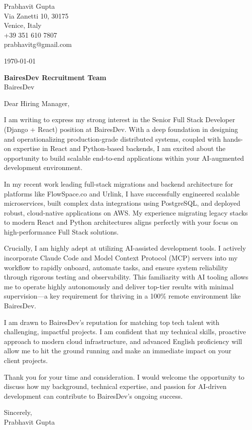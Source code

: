 \documentclass[11pt,a4paper]{article}
\begin{document}
\begin{flushright}
Prabhavit Gupta \\
Via Zanetti 10, 30175 \\
Venice, Italy \\
+39 351 610 7807 \\
prabhavitg@gmail.com \\
\end{flushright}

\vspace{2em}

\noindent
\today

\vspace{1em}

\noindent
\textbf{BairesDev Recruitment Team} \\
BairesDev

\vspace{2em}

\noindent
Dear Hiring Manager,

\vspace{1em}

I am writing to express my strong interest in the Senior Full Stack Developer (Django + React) position at BairesDev. With a deep foundation in designing and operationalizing production-grade distributed systems, coupled with hands-on expertise in React and Python-based backends, I am excited about the opportunity to build scalable end-to-end applications within your AI-augmented development environment.

In my recent work leading full-stack migrations and backend architecture for platforms like FlowSpace.co and Urlink, I have successfully engineered scalable microservices, built complex data integrations using PostgreSQL, and deployed robust, cloud-native applications on AWS. My experience migrating legacy stacks to modern React and Python architectures aligns perfectly with your focus on high-performance Full Stack solutions.

Crucially, I am highly adept at utilizing AI-assisted development tools. I actively incorporate Claude Code and Model Context Protocol (MCP) servers into my workflow to rapidly onboard, automate tasks, and ensure system reliability through rigorous testing and observability. This familiarity with AI tooling allows me to operate highly autonomously and deliver top-tier results with minimal supervision—a key requirement for thriving in a 100\% remote environment like BairesDev.

I am drawn to BairesDev's reputation for matching top tech talent with challenging, impactful projects. I am confident that my technical skills, proactive approach to modern cloud infrastructure, and advanced English proficiency will allow me to hit the ground running and make an immediate impact on your client projects.

Thank you for your time and consideration. I would welcome the opportunity to discuss how my background, technical expertise, and passion for AI-driven development can contribute to BairesDev's ongoing success.

\vspace{1em}

\noindent
Sincerely, \\
\vspace{1em}
Prabhavit Gupta
\end{document}
